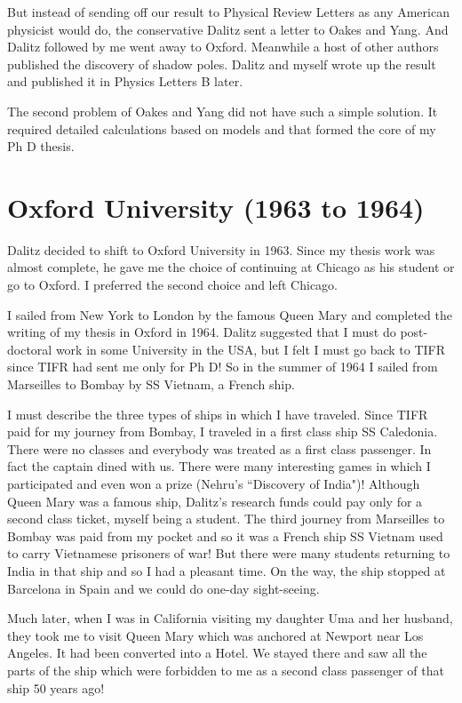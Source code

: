 But instead of sending off our result to Physical Review Letters as any 
American physicist would do, the conservative Dalitz sent a letter to 
Oakes and Yang. And Dalitz followed by me went away to Oxford. Meanwhile 
a host of other authors published the discovery of shadow poles. Dalitz 
and myself wrote up the result and published it in Physics Letters B 
later.

The second problem of Oakes and Yang did not have such a simple 
solution. It required detailed calculations based on models and that 
formed the core of my Ph D thesis.

\section*{Oxford University (1963 to  1964)}

Dalitz decided to shift to Oxford University in 1963. Since my thesis 
work was almost complete, he gave me the choice of continuing at Chicago 
as his student or go to Oxford. I preferred the second choice and left 
Chicago.

I sailed from New York to London by the famous Queen Mary and completed 
the writing of my thesis in Oxford in 1964. Dalitz suggested that I must 
do post-doctoral work in some University in the USA, but I felt I must go 
back to TIFR since TIFR had sent me only for Ph D! So in the summer of 
1964 I sailed from Marseilles to Bombay by SS Vietnam, a French ship.

I must describe the three types of ships in which I have traveled. 
Since TIFR paid for my journey from Bombay, I traveled in a first class 
ship SS Caledonia. There were no classes and everybody was treated as a 
first class passenger. In fact the captain dined with us. There were many 
interesting games in which I participated and even won a prize (Nehru's 
``Discovery of India")! Although Queen Mary was a famous ship, Dalitz's 
research funds could pay only for a second class ticket, myself being a 
student. The third journey from Marseilles to Bombay was paid from my 
pocket and so it was a French ship SS Vietnam used to carry Vietnamese 
prisoners of war! But there were many students returning to India in 
that ship and so I had a pleasant time. On the way, the ship stopped at 
Barcelona in Spain and we could do one-day sight-seeing.

Much later, when I was in California visiting my daughter Uma and her 
husband, they took me to visit Queen Mary which was anchored at Newport 
near Los Angeles. It had been converted into a Hotel. We stayed there 
and saw all the parts of the ship which were forbidden to me as a second 
class passenger of that ship 50 years ago!

